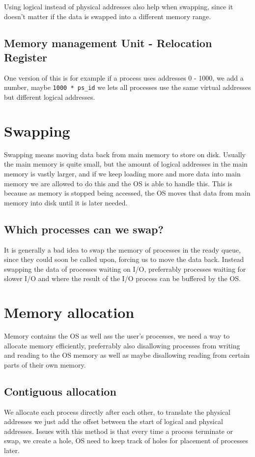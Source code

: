 Using logical instead of physical addresses also help when swapping, since it doesn't matter if the data is swapped into a different memory range.

\subsection{Memory management Unit - Relocation Register}
One version of this is for example if a process uses addresses 0 - 1000, we add a number, maybe \lstinline{1000 * ps_id} we lets all processes use the same virtual addresses but different logical addresses.

\section{Swapping}
Swapping means moving data back from main memory to store on disk. Usually the main memory is quite small, but the amount of logical addresses in the main memory is vastly larger, and if we keep loading more and more data into main memory we are allowed to do this and the OS is able to handle this. This is because as memory is stopped being accessed, the OS moves that data from main memory into disk until it is later needed.

\subsection{Which processes can we swap?}
It is generally a bad idea to swap the memory of processes in the ready queue, since they could soon be called upon, forcing us to move the data back. Instead swapping the data of processes waiting on I/O, preferrably processes waiting for slower I/O and where the result of the I/O process can be buffered by the OS.

\section{Memory allocation}
Memory contains the OS as well ass the user's processes, we need a way to allocate memory efficiently, preferrably also disallowing processes from writing and reading to the OS memory as well as maybe disallowing reading from certain parts of their own memory.

\subsection{Contiguous allocation}
We allocate each process directly after each other, to translate the physical addresses we just add the offset between the start of logical and physical addresses.
Issues with this method is that every time a process terminate or swap, we create a hole, OS need to keep track of holes for placement of processes later.

